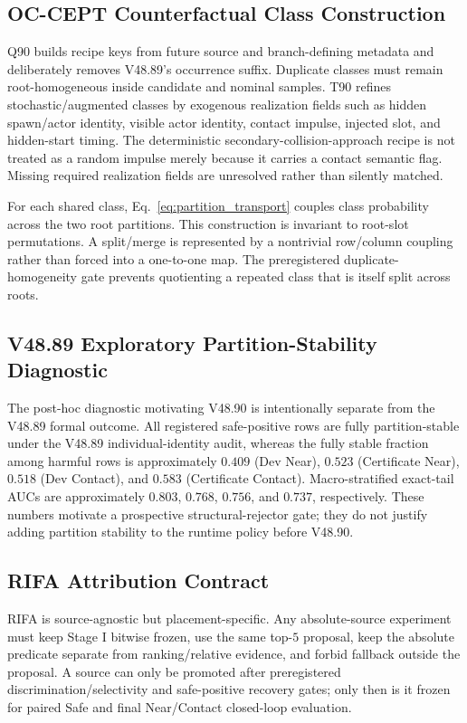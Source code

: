 \documentclass[conference]{IEEEtran}
\begin{document}
\subsection{OC-CEPT Counterfactual Class Construction}
\label{app:cept}
Q90 builds recipe keys from future source and branch-defining metadata and deliberately removes V48.89's occurrence suffix. Duplicate classes must remain root-homogeneous inside candidate and nominal samples. T90 refines stochastic/augmented classes by exogenous realization fields such as hidden spawn/actor identity, visible actor identity, contact impulse, injected slot, and hidden-start timing. The deterministic secondary-collision-approach recipe is not treated as a random impulse merely because it carries a contact semantic flag. Missing required realization fields are unresolved rather than silently matched.

For each shared class, Eq.~\eqref{eq:partition_transport} couples class probability across the two root partitions. This construction is invariant to root-slot permutations. A split/merge is represented by a nontrivial row/column coupling rather than forced into a one-to-one map. The preregistered duplicate-homogeneity gate prevents quotienting a repeated class that is itself split across roots.

\subsection{V48.89 Exploratory Partition-Stability Diagnostic}
The post-hoc diagnostic motivating V48.90 is intentionally separate from the V48.89 formal outcome. All registered safe-positive rows are fully partition-stable under the V48.89 individual-identity audit, whereas the fully stable fraction among harmful rows is approximately $0.409$ (Dev Near), $0.523$ (Certificate Near), $0.518$ (Dev Contact), and $0.583$ (Certificate Contact). Macro-stratified exact-tail AUCs are approximately $0.803$, $0.768$, $0.756$, and $0.737$, respectively. These numbers motivate a prospective structural-rejector gate; they do not justify adding partition stability to the runtime policy before V48.90.

\subsection{RIFA Attribution Contract}
RIFA is source-agnostic but placement-specific. Any absolute-source experiment must keep Stage I bitwise frozen, use the same top-$5$ proposal, keep the absolute predicate separate from ranking/relative evidence, and forbid fallback outside the proposal. A source can only be promoted after preregistered discrimination/selectivity and safe-positive recovery gates; only then is it frozen for paired Safe and final Near/Contact closed-loop evaluation.
\end{document}
